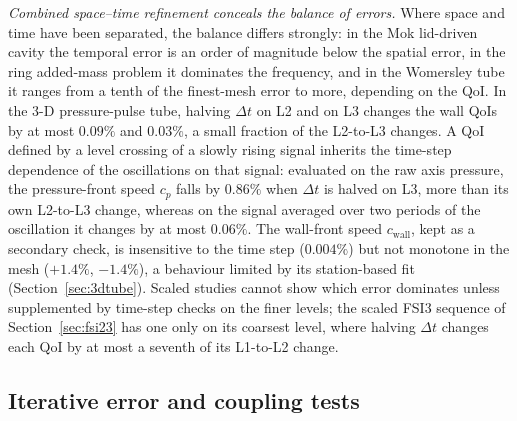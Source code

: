 \emph{Combined space--time refinement conceals the balance of errors.}
Where space and time have been separated, the balance differs strongly: in the Mok lid-driven cavity the temporal error is an order of magnitude below the spatial error, in the ring added-mass problem it dominates the frequency, and in the Womersley tube it ranges from a tenth of the finest-mesh error to more, depending on the QoI.
In the 3-D pressure-pulse tube, halving $\Delta t$ on L2 and on L3 changes the wall QoIs by at most $0.09\%$ and $0.03\%$, a small fraction of the L2-to-L3 changes. A QoI defined by a level crossing of a slowly rising signal inherits the time-step dependence of the oscillations on that signal: evaluated on the raw axis pressure, the pressure-front speed $c_p$ falls by $0.86\%$ when $\Delta t$ is halved on L3, more than its own L2-to-L3 change, whereas on the signal averaged over two periods of the oscillation it changes by at most $0.06\%$. The wall-front speed $c_\mathrm{wall}$, kept as a secondary check, is insensitive to the time step ($0.004\%$) but not monotone in the mesh ($+1.4\%$, $-1.4\%$), a behaviour limited by its station-based fit (Section~\ref{sec:3dtube}).
Scaled studies cannot show which error dominates unless supplemented by time-step checks on the finer levels; the scaled FSI3 sequence of Section~\ref{sec:fsi23} has one only on its coarsest level, where halving $\Delta t$ changes each QoI by at most a seventh of its L1-to-L2 change.

\subsection{Iterative error and coupling tests}\label{sec:iterative_errors}

